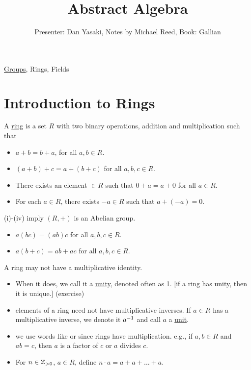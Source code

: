 \documentclass[]{article}
\author{Presenter: Dan Yasaki, Notes by Michael Reed, Book: Gallian}
\title{Abstract Algebra}
\begin{document}
\maketitle


\ul{Groups}, Rings, Fields

\section{Introduction to Rings}

\begin{definition}
	A \ul{ring} is a set $R$ with two binary operations, addition  and multiplication  such that
	\begin{itemize}
		\item[(i)] $a+b=b+a$, for all $a,b\in R$.
		\item[(ii)] $(a+b)+c=a+(b+c)$ for all $a,b,c\in R$.
		\item[(iii)] There exists an element $\in R$ such that $0+a=a+0$ for all $a\in R$.
		\item[(iv)] For each $a\in R$, there exists $-a\in R$ such that $a+(-a)=0$.
	\end{itemize}
	(i)-(iv) imply $(R,+)$ is an Abelian group.
	\begin{itemize}
		\item[(v)] $a(bc) = (ab)c$ for all $a,b,c\in R$.
		\item[(vi)] $a(b+c)=ab+ac$ for all $a,b,c\in R$.
	\end{itemize}
\end{definition}
\begin{remark}
	A ring may not have a multiplicative identity.
	\begin{itemize}
		\item When it does, we call it a \ul{unity}, denoted often as 1.
			[if a ring has unity, then it is unique.] (exercise)
		\item elements of a ring need not have multiplicative inverses.
			If $a\in R$ has a multiplicative inverse, we denote it $a^{-1}$ and call $a$ a \ul{unit}.
		\item we use words like  or  since rings have multiplication. e.g., if $a,b\in R$ and $ab=c$, then $a$ is a factor of $c$ or $a$ divides $c$.
		\item For $n\in\mathbb{Z}_{>0}$, $a\in R$, define $n\cdot a = a+a+\dots+a$.
	\end{itemize}
\end{remark}
\end{document}
